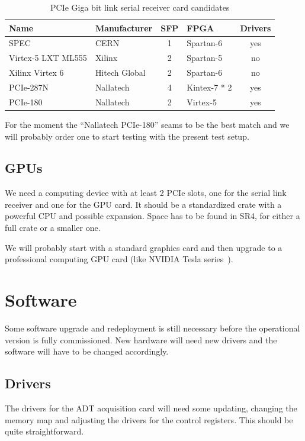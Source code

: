 \begin{table}[H]
\caption{PCIe Giga bit link serial receiver card candidates}
\label{tab:receiver_cards}
\centering
\begin{tabular}{|ll|c|l|c|}
\hline
Name & Manufacturer & SFP & FPGA & Drivers \\
\hline
\hline
SPEC & CERN & 1 & Spartan-6 & yes \\
\hline
Virtex-5 LXT ML555 & Xilinx & 2 & Spartan-5 & no \\
\hline
Xilinx Virtex 6 & Hitech Global & 2 & Spartan-6 & no \\
\hline		
PCIe-287N & Nallatech & 4 & Kintex-7 * 2 & yes \\		
PCIe-180 & Nallatech & 2 & Virtex-5 & yes \\
\hline
\end{tabular}
\end{table}

For the moment the ``Nallatech PCIe-180'' seams to be the best match and we will probably order one to start testing with the present test setup.

\subsection{GPUs}

We need a computing device with at least 2 PCIe slots, one for the serial link receiver and one for the \gls{GPU} card. It should be a standardized crate with a powerful \gls{CPU} and possible expansion. Space has to be found in SR4, for either a full crate or a smaller one.

We will probably start with a standard graphics card and then upgrade to a professional computing \gls{GPU} card (like NVIDIA Tesla series~\cite{nvidia}).

\section{Software}

Some software upgrade and redeployment is still necessary before the operational version is fully commissioned. New hardware will need new drivers and the software will have to be changed accordingly.

\subsection{Drivers}

The drivers for the \gls{ADT} acquisition card will need some updating, changing the memory map and adjusting the drivers for the control registers. This should be quite straightforward.

